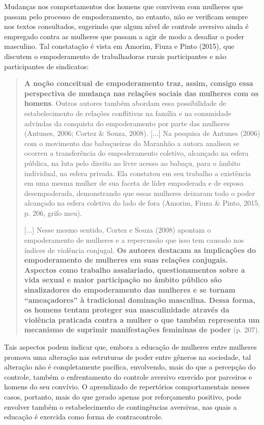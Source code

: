 Mudanças nos comportamentos dos homens que convivem com mulheres que passam pelo processo de empoderamento, no entanto, não se verificam sempre nos textos consultados, sugerindo que algum nível de controle aversivo ainda é empregado contra as mulheres que passam a agir de modo a desafiar o poder masculino. Tal constatação é vista em Amorim, Fiuza e Pinto (2015), que discutem o empoderamento de trabalhadoras rurais participantes e não participantes de sindicatos:

\begin{quote}
    \textbf{A noção conceitual de empoderamento traz, assim, consigo essa perspectiva de mudança nas relações sociais das mulheres com os homens}. Outros autores também abordam essa possibilidade de estabelecimento de relações conflitivas na família e na comunidade advindas da conquista do empoderamento por parte das mulheres (Antunes, 2006; Cortez \& Souza, 2008). [...] Na pesquisa de Antunes (2006) com o movimento das babaçueiras do Maranhão a autora analisou se ocorreu a transferência do empoderamento coletivo, alcançado na esfera pública, na luta pelo direito ao livre acesso ao babaçu, para o âmbito individual, na esfera privada. Ela constatou em seu trabalho a existência em uma mesma mulher de sua faceta de líder empoderada e de esposa desempoderada, demonstrando que essas mulheres deixaram todo o poder alcançado na esfera coletiva do lado de fora (Amorim, Fiuza \& Pinto, 2015, p. 206, grifo meu).

    [...] Nesse mesmo sentido, Cortez e Souza (2008) apontam o empoderamento de mulheres e a repercussão que isso tem causado nos índices de violência conjugal. \textbf{Os autores destacam as implicações do empoderamento de mulheres em suas relações conjugais. Aspectos como trabalho assalariado, questionamentos sobre a vida sexual e maior participação no âmbito público são sinalizadores do empoderamento das mulheres e se tornam ``ameaçadores'' à tradicional dominação masculina. Dessa forma, os homens tentam proteger sua masculinidade através da violência praticada contra a mulher o que também representa um mecanismo de suprimir manifestações femininas de poder} (p. 207).
\end{quote}

Tais aspectos podem indicar que, embora a educação de mulheres entre mulheres promova uma alteração nas estruturas de poder entre gêneros na sociedade, tal alteração não é completamente pacífica, envolvendo, mais do que a percepção do controle, também o enfrentamento do controle aversivo exercido por parceiros e homens do seu convívio. O aprendizado de repertórios comportamentais nesses casos, portanto, mais do que gerado apenas por reforçamento positivo, pode envolver também o estabelecimento de contingências aversivas, nas quais a educação é exercida como forma de contracontrole.

